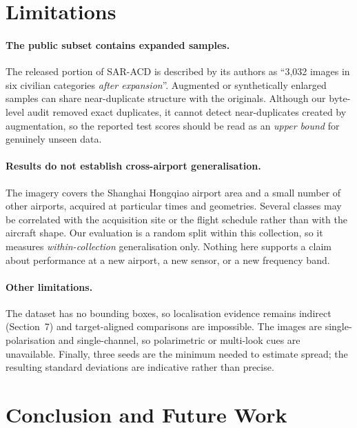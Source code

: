 \documentclass[sigconf, screen]{acmart}
\begin{document}
\section{Limitations}

\paragraph{The public subset contains expanded samples.}
The released portion of SAR-ACD is described by its authors as
``3,032 images in six civilian categories \emph{after expansion}''.
Augmented or synthetically enlarged samples can share near-duplicate structure
with the originals. Although our byte-level audit removed exact duplicates, it
cannot detect near-duplicates created by augmentation, so the reported test
scores should be read as an \emph{upper bound} for genuinely unseen data.

\paragraph{Results do not establish cross-airport generalisation.}
The imagery covers the Shanghai Hongqiao airport area and a small number of other
airports, acquired at particular times and geometries. Several classes may be
correlated with the acquisition site or the flight schedule rather than with the
aircraft shape. Our evaluation is a random split within this collection, so it
measures \emph{within-collection} generalisation only. Nothing here supports a
claim about performance at a new airport, a new sensor, or a new frequency band.

\paragraph{Other limitations.}
The dataset has no bounding boxes, so localisation evidence remains indirect
(Section~7) and target-aligned comparisons are impossible. The images are
single-polarisation and single-channel, so polarimetric or multi-look cues are
unavailable. Finally, three seeds are the minimum needed to estimate spread; the
resulting standard deviations are indicative rather than precise.

\section{Conclusion and Future Work}
\end{document}
